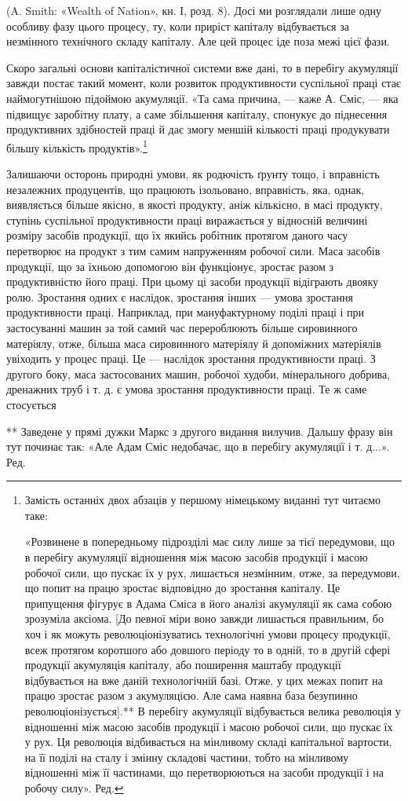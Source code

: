 \parcont{}  %
(A. Smith: «Wealth of Nation», кн. І, розд. 8). Досі ми розглядали
лише одну особливу фазу цього процесу, ту, коли приріст капіталу
відбувається за незмінного технічного складу капіталу.
Але цей процес іде поза межі цієї фази.

Скоро загальні основи капіталістичної системи вже дані, то
в перебігу акумуляції завжди постає такий момент, коли розвиток
продуктивности суспільної праці стає наймогутнішою
підоймою акумуляції. «Та сама причина, — каже А. Сміс, —
яка підвищує заробітну плату, а саме збільшення капіталу,
спонукує до піднесення продуктивних здібностей праці й дає
змогу меншій кількості праці продукувати більшу кількість
продуктів».\footnote*{
Замість останніх двох абзаців у першому німецькому виданні
тут читаємо таке:

«Розвинене в попередньому підрозділі має силу лише за тієї передумови,
що в перебігу акумуляції відношення між масою засобів продукції і
масою робочої сили, що пускає їх у рух, лишається незмінним, отже,
за передумови, що попит на працю зростає відповідно до зростання капіталу.
Це припущення фігурує в Адама Сміса в його аналізі акумуляції
як сама собою зрозуміла аксіома. [До певної міри воно завжди лишається
правильним, бо хоч і як можуть революціонізуватись технологічні умови
процесу продукції, всеж протягом коротшого або довшого періоду то в одній,
то в другій сфері продукції акумуляція капіталу, або поширення маштабу
продукції відбувається на вже даній технологічній базі. Отже, у цих межах
попит на працю зростає разом з акумуляцією. Але сама наявна база
безупинно революціонізується].** В перебігу акумуляції відбувається
велика революція у відношенні між масою засобів продукції і масою робочої
сили, що пускає їх у рух. Ця революція відбивається на мінливому
складі капітальної вартости, на її поділі на сталу і змінну складові частини,
тобто на мінливому відношенні між її частинами, що перетворюються
на засоби продукції і на робочу силу». Ред.
}

Залишаючи осторонь природні умови, як родючість ґрунту
тощо, і вправність незалежних продуцентів, що працюють ізольовано,
вправність, яка, однак, виявляється більше якісно, в якості
продукту, аніж кількісно, в масі продукту, ступінь суспільної
продуктивности праці виражається у відносній величині розміру
засобів продукції, що їх якийсь робітник протягом даного часу
перетворює на продукт з тим самим напруженням робочої сили.
Маса засобів продукції, що за їхньою допомогою він функціонує,
зростає разом з продуктивністю його праці. При цьому ці засоби
продукції відіграють двояку ролю. Зростання одних є наслідок,
зростання інших — умова зростання продуктивности праці.
Наприклад, при мануфактурному поділі праці і при застосуванні
машин за той самий час перероблюють більше сировинного матеріялу,
отже, більша маса сировинного матеріялу й допоміжних
матеріялів увіходить у процес праці. Це — наслідок зростання
продуктивности праці. З другого боку, маса застосованих машин,
робочої худоби, мінерального добрива, дренажних труб і т. д.
є умова зростання продуктивности праці. Те ж саме стосується

** Заведене у прямі дужки Маркс з другого видання вилучив. Дальшу
фразу він тут починає так: «Але Адам Сміс недобачає, що в перебігу
акумуляції і т. д...». Ред.
\parbreak{}  %
